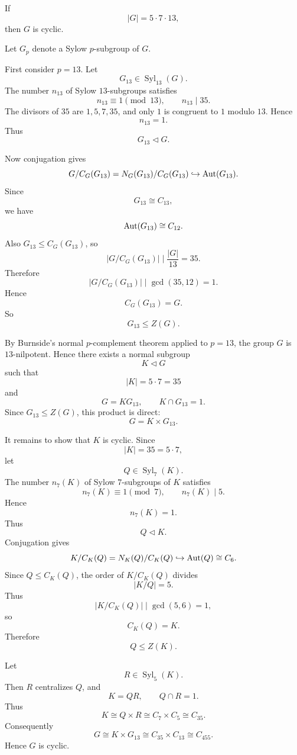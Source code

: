 \begin{example}
If
\[
    |G|=5\cdot 7\cdot 13,
\]
then $G$ is cyclic.

Let $G_p$ denote a Sylow $p$-subgroup of $G$.

First consider $p=13$. Let
\[
    G_{13}\in \operatorname{Syl}_{13}(G).
\]
The number $n_{13}$ of Sylow $13$-subgroups satisfies
\[
    n_{13}\equiv 1\pmod{13},
    \qquad
    n_{13}\mid 35.
\]
The divisors of $35$ are $1,5,7,35$, and only $1$ is congruent to $1$ modulo $13$. Hence
\[
    n_{13}=1.
\]
Thus
\[
    G_{13}\lhd G.
\]

Now conjugation gives
\[
    G/C_G(G_{13})
    =
    N_G(G_{13})/C_G(G_{13})
    \hookrightarrow
    \operatorname{Aut}(G_{13}).
\]
Since
\[
    G_{13}\cong C_{13},
\]
we have
\[
    \operatorname{Aut}(G_{13})\cong C_{12}.
\]
Also $G_{13}\leq C_G(G_{13})$, so
\[
    |G/C_G(G_{13})|
    \mid
    \frac{|G|}{13}
    =
    35.
\]
Therefore
\[
    |G/C_G(G_{13})|
    \mid \gcd(35,12)=1.
\]
Hence
\[
    C_G(G_{13})=G.
\]
So
\[
    G_{13}\leq Z(G).
\]

By Burnside's normal $p$-complement theorem applied to $p=13$, the group $G$ is $13$-nilpotent. Hence there exists a normal subgroup
\[
    K\lhd G
\]
such that
\[
    |K|=5\cdot 7=35
\]
and
\[
    G=K G_{13},
    \qquad
    K\cap G_{13}=1.
\]
Since $G_{13}\leq Z(G)$, this product is direct:
\[
    G=K\times G_{13}.
\]

It remains to show that $K$ is cyclic. Since
\[
    |K|=35=5\cdot 7,
\]
let
\[
    Q\in \operatorname{Syl}_7(K).
\]
The number $n_7(K)$ of Sylow $7$-subgroups of $K$ satisfies
\[
    n_7(K)\equiv 1\pmod 7,
    \qquad
    n_7(K)\mid 5.
\]
Hence
\[
    n_7(K)=1.
\]
Thus
\[
    Q\lhd K.
\]
Conjugation gives
\[
    K/C_K(Q)
    =
    N_K(Q)/C_K(Q)
    \hookrightarrow
    \operatorname{Aut}(Q)
    \cong C_6.
\]
Since $Q\leq C_K(Q)$, the order of $K/C_K(Q)$ divides
\[
    |K/Q|=5.
\]
Thus
\[
    |K/C_K(Q)|\mid \gcd(5,6)=1,
\]
so
\[
    C_K(Q)=K.
\]
Therefore
\[
    Q\leq Z(K).
\]

Let
\[
    R\in \operatorname{Syl}_5(K).
\]
Then $R$ centralizes $Q$, and
\[
    K=QR,
    \qquad
    Q\cap R=1.
\]
Thus
\[
    K\cong Q\times R\cong C_7\times C_5\cong C_{35}.
\]
Consequently
\[
    G\cong K\times G_{13}
    \cong C_{35}\times C_{13}
    \cong C_{455}.
\]
Hence $G$ is cyclic.
\end{example}